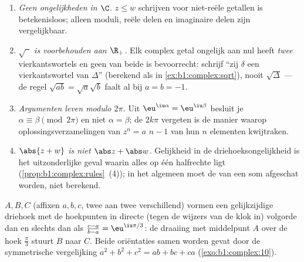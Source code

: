 \begin{remark}\label{rem:b1:complex:pitfalls}
\begin{enumerate}
  \item \emph{Geen ongelijkheden in $\C$.} $z \leq w$ schrijven voor
        niet-reële getallen is betekenisloos; alleen moduli, reële
        delen en imaginaire delen zijn vergelijkbaar.
  \item \emph{$\sqrt{\phantom z}$ is voorbehouden aan $\R_+$.} Elk
        complex getal ongelijk aan nul heeft \emph{twee}
        vierkantswortels en geen van beide is bevoorrecht: schrijf
        ``zij $\delta$ een vierkantswortel van $\Delta$'' (berekend als
        in \cref{ex:b1:complex:sqrt}), nooit $\sqrt\Delta$ --- de regel
        $\sqrt{ab} = \sqrt a\sqrt b$ faalt al bij $a = b = -1$.
  \item \emph{Argumenten leven modulo $2\pi$.} Uit $\eu^{\iu\alpha} =
        \eu^{\iu\beta}$ besluit je $\alpha \equiv \beta \pmod{2\pi}$ en
        niet $\alpha = \beta$; de $2k\pi$ vergeten is de manier waarop
        oplossingsverzamelingen van $z^n = a$ $n - 1$ van hun $n$
        elementen kwijtraken.
  \item \emph{$\abs{z + w}$ is niet $\abs z + \abs w$.} Gelijkheid in
        de driehoeksongelijkheid is het uitzonderlijke geval waarin
        alles op één halfrechte ligt
        (\cref{prop:b1:complex:rules}~(4)); in het algemeen moet de
         van een som afgeschat worden, niet berekend.
\end{enumerate}
\end{remark}

\begin{example}\label{ex:b1:complex:equilateral}
$A, B, C$ (affixen $a, b, c$, twee aan twee verschillend) vormen een
gelijkzijdige driehoek met de hoekpunten in directe (tegen de wijzers
van de klok in) volgorde dan en slechts dan als $\frac{c - a}{b - a} =
\eu^{\iu\pi/3}$: de draaiing met middelpunt $A$ over de hoek $\frac\pi3$
stuurt $B$ naar $C$. Beide oriëntaties samen worden gevat door de
symmetrische vergelijking $a^2 + b^2 + c^2 = ab + bc + ca$
(\cref{exo:b1:complex:10}).
\end{example}

